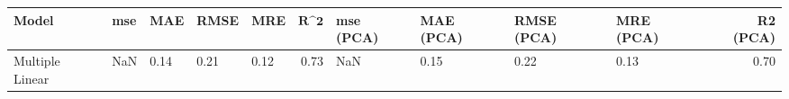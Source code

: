 \begin{table}
\centering
\label{table:iri_reg_pred}
\begin{tabular}{lllllrllllr}
\toprule
 \textbf{Model} & \textbf{mse} & \textbf{MAE} & \textbf{RMSE} & \textbf{MRE} & $\textbf{R^2}$ & \textbf{mse (PCA)} & \textbf{MAE (PCA)} & \textbf{RMSE (PCA)} & \textbf{MRE (PCA)} & \textbf{R2 (PCA)} \\
\midrule
Multiple Linear &          NaN &         0.14 &          0.21 &         0.12 &           0.73 &                NaN &               0.15 &                0.22 &               0.13 &              0.70 \\
\bottomrule
\end{tabular}
\end{table}
